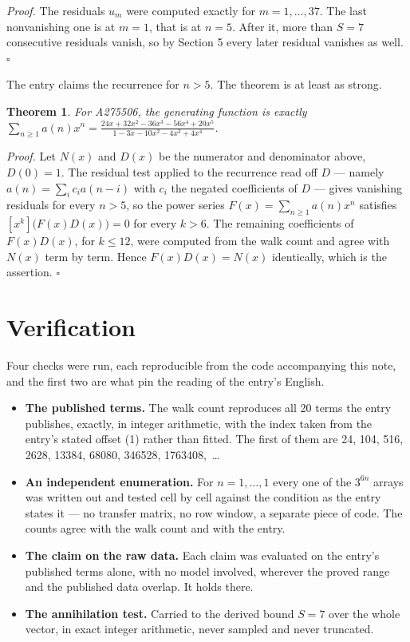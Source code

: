 \documentclass[11pt]{article}
\newtheorem{theorem}{Theorem}
\theoremstyle{definition}
\begin{document}
{\itshape Proof.} The residuals $u_m$ were computed exactly for $m = 1,\dots,37$. The last nonvanishing one is at $m = 1$, that is at $n = 5$. After it, more than $S = 7$ consecutive residuals vanish, so by Section 5 every later residual vanishes as well. $\square$

The entry claims the recurrence for $n > 5$. The theorem is at least as strong.

\begin{theorem} For A275506, the generating function is exactly $\sum_{n\ge 1} a(n)x^n = \frac{24x + 32x^{2} - 36x^{3} - 56x^{4} + 20x^{5}}{1 - 3x - 10x^{2} - 4x^{3} + 4x^{4}}$.\end{theorem}

{\itshape Proof.} Let $N(x)$ and $D(x)$ be the numerator and denominator above, $D(0)=1$. The residual test applied to the recurrence read off $D$ --- namely $a(n) = \sum_i c_i a(n-i)$ with $c_i$ the negated coefficients of $D$ --- gives vanishing residuals for every $n > 5$, so the power series $F(x)=\sum_{n\ge 1}a(n)x^n$ satisfies $[x^k]\bigl(F(x)D(x)\bigr) = 0$ for every $k > 6$. The remaining coefficients of $F(x)D(x)$, for $k \le 12$, were computed from the walk count and agree with $N(x)$ term by term. Hence $F(x)D(x) = N(x)$ identically, which is the assertion. $\square$

\section{Verification}

Four checks were run, each reproducible from the code accompanying this note, and the first two are what pin the reading of the entry's English.

\begin{itemize}

\item {\bfseries The published terms.} The walk count reproduces all 20 terms the entry publishes, exactly, in integer arithmetic, with the index taken from the entry's stated offset (1) rather than fitted. The first of them are 24, 104, 516, 2628, 13384, 68080, 346528, 1763408,~\dots

\item {\bfseries An independent enumeration.} For $n = 1,\dots,1$ every one of the $3^{6n}$ arrays was written out and tested cell by cell against the condition as the entry states it --- no transfer matrix, no row window, a separate piece of code. The counts agree with the walk count and with the entry.

\item {\bfseries The claim on the raw data.} Each claim was evaluated on the entry's published terms alone, with no model involved, wherever the proved range and the published data overlap. It holds there.

\item {\bfseries The annihilation test.} Carried to the derived bound $S = 7$ over the whole vector, in exact integer arithmetic, never sampled and never truncated.

\end{itemize}
\end{document}
